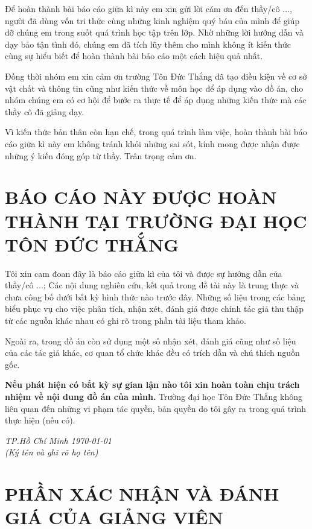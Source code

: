 \documentclass[oneside, 12pt]{report}   	%
\begin{document}
Để hoàn thành bài báo cáo giữa kì này em xin gửi lời cám ơn đến thầy/cô ..., người đã dùng vốn tri thức cùng những kinh nghiệm quý báu của mình để giúp đỡ chúng em trong suốt quá trình học tập trên lớp. Nhờ những lời hướng dẫn và dạy bảo tận tình đó, chúng em đã tích lũy thêm cho mình không ít kiến thức cùng sự hiểu biết để hoàn thành bài báo cáo một cách hiệu quả nhất.

Đồng thời nhóm em xin cảm ơn trường Tôn Đức Thắng đã tạo điều kiện về cơ sở vật chất và thông tin cũng như kiến thức về môn học để áp dụng vào đồ án, cho nhóm chúng em có cơ hội để bước ra thực tế để áp dụng những kiến thức mà các thầy cô đã giảng dạy.

Vì kiến thức bản thân còn hạn chế, trong quá trình làm việc, hoàn thành bài báo cáo giữa kì này em không tránh khỏi những sai sót, kính mong được nhận được những ý kiến đóng góp từ thầy. Trân trọng cảm ơn.


\newpage
\section{\centering BÁO CÁO NÀY ĐƯỢC HOÀN THÀNH TẠI TRƯỜNG ĐẠI HỌC TÔN ĐỨC THẮNG}

Tôi xin cam đoan đây là báo cáo giữa kì của tôi và được sự hướng dẫn của thầy/cô ...; Các nội dung nghiên cứu, kết quả trong đề tài này là trung thực và chưa công bố dưới bất kỳ hình thức nào trước đây. Những số liệu trong các bảng biểu phục vụ cho việc phân tích, nhận xét, đánh giá được chính tác giả thu thập từ các nguồn khác nhau có ghi rõ trong phần tài liệu tham khảo.

Ngoài ra, trong đồ án còn sử dụng một số nhận xét, đánh giá cũng như số liệu của các tác giả khác, cơ quan tổ chức khác đều có trích dẫn và chú thích nguồn gốc.


\textbf{Nếu phát hiện có bất kỳ sự gian lận nào tôi xin hoàn toàn chịu trách nhiệm về nội dung đồ án của mình.} Trường đại học Tôn Đức Thắng không liên quan đến những vi phạm tác quyền, bản quyền do tôi gây ra trong quá trình thực hiện (nếu có).

\begin{flushright}
	\textit{TP.Hồ Chí Minh \today}\\
	\textit{(Ký tên và ghi rõ họ tên)}
\end{flushright}

\newpage
\section{\centering PHẦN XÁC NHẬN VÀ ĐÁNH GIÁ CỦA GIẢNG VIÊN}
\end{document}
